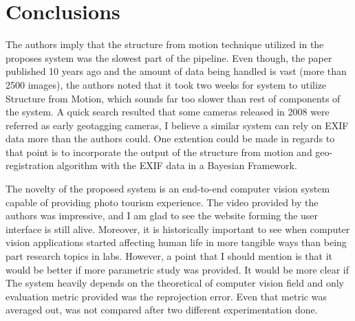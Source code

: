 \documentclass[11pt]{article}
\begin{document}
\section*{Conclusions}

The authors imply that the structure from motion technique utilized in the proposes system was the slowest part of the pipeline.
Even though, the paper published 10 years ago and the amount of data being handled is vast (more than 2500 images), the authors noted that it took two weeks for system to utilize Structure from Motion, which sounds far too slower than rest of components of the system.
A quick search resulted that some cameras released in 2008 were referred as early geotagging cameras, I believe a similar system can rely on EXIF data more than the authors could.
One extention could be made in regards to that point is to incorporate the output of the structure from motion and geo-registration algorithm with the EXIF data in a Bayesian Framework.   



The novelty of the proposed system is an end-to-end computer vision system capable of providing photo tourism experience.
The video provided by the authors was impressive, and I am glad to see the website forming the user interface is still alive.
Moreover, it is historically important to see when computer vision applications started affecting human life in more tangible ways than being part research topics in labs.
However, a point that I should mention is that it would be better if more parametric study was provided.
It would be more clear if
The system heavily depends on the theoretical of computer vision field and only evaluation metric provided was the reprojection error.
Even that metric was averaged out, was not compared after two different experimentation done.

% 
% 
\end{document}
